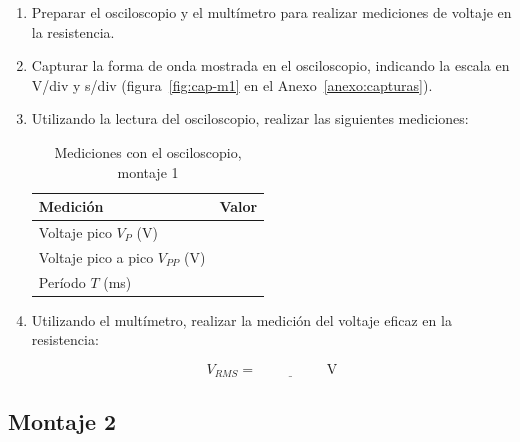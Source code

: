 \documentclass{article}
\newcommand{\vacio}[1][2cm]{\underline{\hspace{#1}}}
\begin{document}
\begin{enumerate}
        \item Preparar el osciloscopio y el multímetro para realizar mediciones de voltaje en la resistencia.


        \item Capturar la forma de onda mostrada en el osciloscopio, indicando la escala en V/div y s/div (figura~\ref{fig:cap-m1} en el Anexo~\ref{anexo:capturas}).

        \item Utilizando la lectura del osciloscopio, realizar las siguientes mediciones:

        \begin{table}[ht!]
            \centering
            \begin{tabular}{lc}
                \toprule
                Medición                         & Valor  \\
                \midrule
                Voltaje pico $V_P$ (V)           & \vacio \\
                Voltaje pico a pico $V_{PP}$ (V) & \vacio \\
                Período $T$ (ms)                 & \vacio \\
                \bottomrule
            \end{tabular}
            \caption{Mediciones con el osciloscopio, montaje 1}\label{tab:osc-m1}
        \end{table}

        \item Utilizando el multímetro, realizar la medición del voltaje eficaz en la resistencia:

        \[
            V_{RMS} = \vacio\ \si{\volt}
        \]
    \end{enumerate}

    \subsection{Montaje 2}
\end{document}
